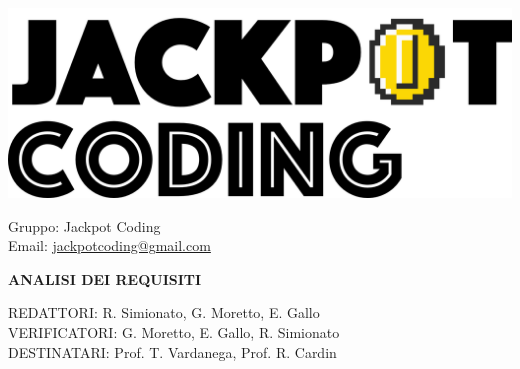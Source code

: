 \documentclass[5pt]{article}
\begin{document}
\begin{minipage}[t]{0.50\textwidth}
    \begin{flushleft}
        \hspace{10pt}
        \includegraphics[scale=0.65]{jackpot-logo.png} 
    \end{flushleft}
\end{minipage}
\hspace{-60pt} %
\begin{flushright}
    \begin{minipage}[t]{0.50\textwidth}
        \begin{flushright}
            Gruppo: {\Large Jackpot Coding}\\
            Email: \href{mailto:jackpotcoding@gmail.com}{jackpotcoding@gmail.com}
        \end{flushright}
    \end{minipage}
\end{flushright}

\vspace{24pt}

\begin{center}
    \textbf{\LARGE ANALISI DEI REQUISITI}
\end{center}

\vspace{13pt}

\begin{flushleft}
    \begin{spacing}{1.5}
        REDATTORI: R. Simionato, G. Moretto, E. Gallo\\%
        VERIFICATORI: G. Moretto, E. Gallo, R. Simionato\\
        \vspace{7pt}
        DESTINATARI: Prof. T. Vardanega, Prof. R. Cardin\\%
    \end{spacing}
\end{flushleft}
\end{document}

